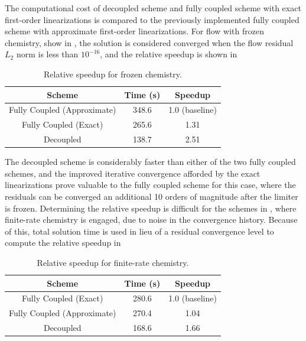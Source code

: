 The computational cost of decoupled scheme and fully coupled scheme with exact
first-order linearizations is compared to the previously implemented fully coupled
scheme with approximate first-order linearizations.
For flow with frozen chemistry, show in ,
the solution is considered converged when the flow residual $L_2$ norm is less
than $10^{-16}$, and the relative speedup is shown in
\begin{table}[h]
  \centering
  \caption{Relative speedup for frozen chemistry.}
  \begin{tabular}{c|c|c}
    Scheme & Time (s) & Speedup \\
    \hline
    Fully Coupled (Approximate) & 348.6 & 1.0 (baseline) \\
    Fully Coupled (Exact)       & 265.6 & 1.31 \\
    Decoupled                   & 138.7 & 2.51
  \end{tabular}
  \label{tab:srp-rel-speedup-frozen}
\end{table}
The decoupled scheme is considerably faster than either of the two fully coupled
schemes, and the improved iterative convergence afforded by the exact
linearizations prove valuable to the fully coupled scheme for this case, where
the residuals can be converged an additional 10 orders of magnitude after the
limiter is frozen.  Determining the relative speedup is difficult for the
schemes in , where finite-rate chemistry is
engaged, due to noise in the convergence history.  Because of this, total
solution time is used in lieu of a residual convergence level to compute the
relative speedup in 
\begin{table}[h]
  \centering
  \caption{Relative speedup for finite-rate chemistry.}
  \begin{tabular}{c|c|c}
    Scheme & Time (s) & Speedup \\
    \hline
    Fully Coupled (Exact)       & 280.6 & 1.0 (baseline) \\
    Fully Coupled (Approximate) & 270.4 & 1.04 \\
    Decoupled                   & 168.6 & 1.66
  \end{tabular}
  \label{tab:srp-rel-speedup-chem}
\end{table}
